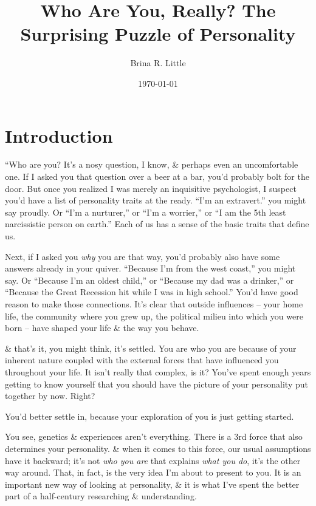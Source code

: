 \documentclass{article}
\title{Who Are You, Really? The Surprising Puzzle of Personality}
\author{Brina R. Little}
\date{\today}
\numberwithin{equation}{section}
\begin{document}
\maketitle
\tableofcontents


\section*{Introduction}
``Who are you? It's a nosy question, I know, \& perhaps even an uncomfortable one. If I asked you that question over a beer at a bar, you'd probably bolt for the door. But once you realized I was merely an inquisitive psychologist, I suspect you'd have a list of personality traits at the ready. ``I'm an extravert.'' you might say proudly. Or ``I'm a nurturer,'' or ``I'm a worrier,'' or ``I am the 5th least narcissistic person on earth.'' Each of us has a sense of the basic traits that define us.

Next, if I asked you \textit{why} you are that way, you'd probably also have some answers already in your quiver. ``Because I'm from the west coast,'' you might say. Or ``Because I'm an oldest child,'' or ``Because my dad was a drinker,'' or ``Because the Great Recession hit while I was in high school.'' You'd have good reason to make those connections. It's clear that outside influences -- your home life, the community where you grew up, the political milieu into which you were born -- have shaped your life \& the way you behave.

\& that's it, you might think, it's settled. You are who you are because of your inherent nature coupled with the external forces that have influenced you throughout your life. It isn't really that complex, is it? You've spent enough years getting to know yourself that you should have the picture of your personality put together by now. Right?

You'd better settle in, because your exploration of you is just getting started.

You see, genetics \& experiences aren't everything. There is a 3rd force that also determines your personality. \& when it comes to this force, our usual assumptions have it backward; it's not \textit{who you are} that explains \textit{what you do}, it's the other way around. That, in fact, is the very idea I'm about to present to you. It is an important new way of looking at personality, \& it is what I've spent the better part of a half-century researching \& understanding.
\end{document}
